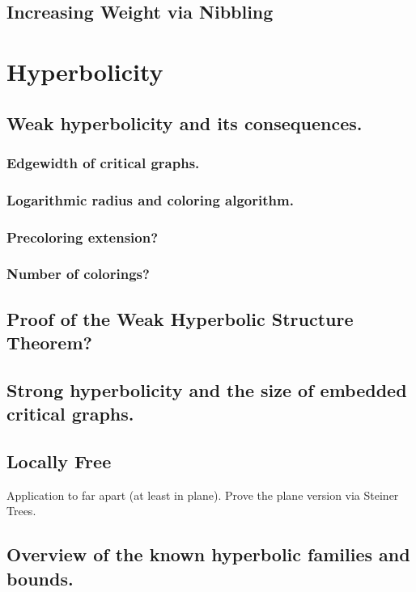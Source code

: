 \documentclass[12pt,twoside,openright,a4paper]{book}
\begin{document}
\section{Increasing Weight via Nibbling}

\chapter{Hyperbolicity}


\section{Weak hyperbolicity and its consequences.}

\subsection{Edgewidth of critical graphs. }
\subsection{Logarithmic radius and coloring algorithm.}
\subsection{Precoloring extension?}
\subsection{Number of colorings? }

\section{Proof of the Weak Hyperbolic Structure Theorem?}

\section{Strong hyperbolicity and the size of embedded critical graphs.}

\section{Locally Free}

Application to far apart (at least in plane). Prove the plane version via Steiner Trees.

\section{Overview of the known hyperbolic families and bounds.}
\end{document}
